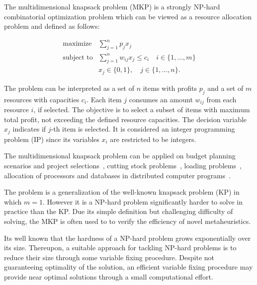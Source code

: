 
The multidimensional knapsack problem (MKP) is a strongly NP-hard combinatorial
optimization problem which can be viewed as a resource allocation problem and
defined as follows:

\begin{align}
  \text{maximize} & \sum_{j=1}^n p_j x_j \\
  \text{subject to} & \sum_{j=1}^n w_{ij} x_j \leqslant c_i \quad i \in \{1, \ldots, m\}\\
   & x_j \in \{0, 1\}, \quad j \in \{1, \ldots, n\}.
\end{align}

The problem can be interpreted as a set of $n$ items with profits $p_j$
and a set of $m$ resources with capacities $c_i$.
Each item $j$ consumes an amount $w_{ij}$ from each resource $i$, if selected.
The objective is to select a subset of items with maximum total profit,
not exceeding the defined resource capacities.
The decision variable $x_j$ indicates if $j$-th item is selected.
It is considered an integer programming problem (IP) since its variables $x_i$
are restricted to be integers.

The multidimensional knapsack problem can be applied on budget planning 
scenarios and project selections~\cite{mcmillan1973resource},
cutting stock problems~\cite{Gilmore-Gomory-1966}, loading problems~\cite{Shih-1979},
allocation of processors and databases in distributed computer programs~\cite{Gavish-Pirckul-1982}.

The problem is a generalization of the well-known knapsack problem (KP) in which
$m = 1$.
However it is a NP-hard problem significantly harder to solve in practice than the KP.
Due its simple definition but challenging difficulty of solving, the MKP is often used to
to verify the efficiency of novel metaheuristics.

Its well known that the hardness of a NP-hard problem grows exponentially over
its size.
Thereupon, a suitable approach for tackling NP-hard problems is to reduce their size
through some variable fixing procedure.
Despite not guaranteeing optimality of the solution, an efficient variable
fixing procedure may provide near optimal solutions through a small computational effort.


